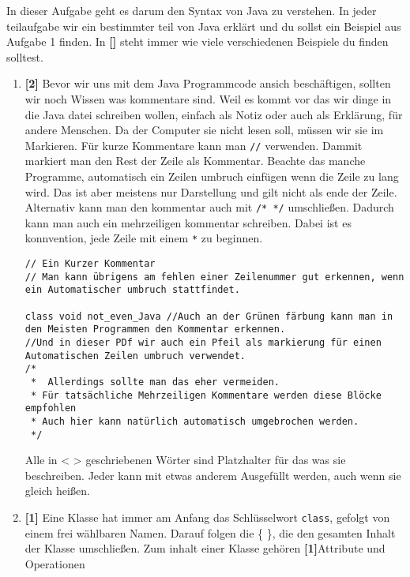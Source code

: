 
In dieser Aufgabe geht es darum den Syntax von Java zu verstehen.
In jeder teilaufgabe wir ein bestimmter teil von Java erklärt und du sollst ein Beispiel aus Aufgabe 1 finden. In \textbf{[]} steht immer wie viele verschiedenen Beispiele du finden solltest.

\begin{enumerate}
    \item \textbf{[2]} Bevor wir uns mit dem Java Programmcode ansich beschäftigen, sollten wir noch Wissen was kommentare sind.
    Weil es kommt vor das wir dinge in die Java datei schreiben wollen, einfach als Notiz oder auch als Erklärung, für andere Menschen. Da der Computer sie nicht lesen soll, müssen wir sie im Markieren.
          Für kurze Kommentare kann man \lstinline[breaklines=false]{//} verwenden. Dammit markiert man den Rest der Zeile als Kommentar. Beachte das manche Programme, automatisch ein Zeilen umbruch einfügen wenn die Zeile zu lang wird.
          Das ist aber meistens nur Darstellung und gilt nicht als ende der Zeile.
          Alternativ kann man den kommentar auch mit \lstinline[breaklines=false]{/* */} umschließen. Dadurch kann man auch ein mehrzeiligen kommentar schreiben. Dabei ist es konnvention, jede Zeile mit einem \textcolor{javagreen}{\texttt{*}} zu beginnen.
          \begin{lstlisting}[title=\textbf{Kommentar Beispiel}]
// Ein Kurzer Kommentar 
// Man kann übrigens am fehlen einer Zeilenummer gut erkennen, wenn ein Automatischer umbruch stattfindet.
    
class void not_even_Java //Auch an der Grünen färbung kann man in den Meisten Programmen den Kommentar erkennen.
//Und in dieser PDf wir auch ein Pfeil als markierung für einen Automatischen Zeilen umbruch verwendet.
/*
 *  Allerdings sollte man das eher vermeiden.
 * Für tatsächliche Mehrzeiligen Kommentare werden diese Blöcke empfohlen
 * Auch hier kann natürlich automatisch umgebrochen werden.
 */
        \end{lstlisting}
        Alle in < > geschriebenen Wörter sind Platzhalter für das was sie beschreiben. Jeder kann mit etwas anderem Ausgefüllt werden, auch wenn sie gleich heißen.
    \item \textbf{[1]} Eine Klasse hat immer am Anfang das Schlüsselwort \lstinline{class}, gefolgt von einem frei wählbaren Namen. Darauf folgen die \{ \}, die den gesamten Inhalt der Klasse umschließen.
          Zum inhalt einer Klasse gehören \textbf{[1]}Attribute und Operationen


\end{enumerate}
